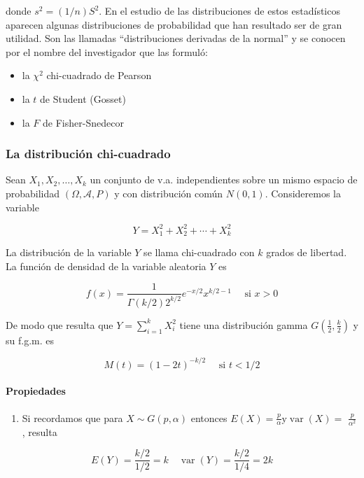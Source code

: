 \documentclass[
]{article}
\providecommand{\tightlist}{%
  \setlength{\itemsep}{0pt}\setlength{\parskip}{0pt}}
\begin{document}
donde \(s^{2}=(1 / n) S^{2}\).
En el estudio de las distribuciones de estos estadísticos aparecen algunas distribuciones de probabilidad que han resultado ser de gran utilidad. Son las llamadas ``distribuciones derivadas de la normal'' y se conocen por el nombre del investigador que las formuló:

\begin{itemize}
\tightlist
\item
  la \(\chi^{2}\) chi-cuadrado de Pearson
\item
  la \(t\) de Student (Gosset)
\item
  la \(F\) de Fisher-Snedecor
\end{itemize}

\subsubsection{La distribución chi-cuadrado}\label{la-distribuciuxf3n-chi-cuadrado}

Sean \(X_{1}, X_{2}, \ldots, X_{k}\) un conjunto de v.a. independientes sobre un mismo espacio de probabilidad \((\Omega, \mathcal{A}, P)\) y con distribución común \(N(0,1)\). Consideremos la variable

\[
Y=X_{1}^{2}+X_{2}^{2}+\cdots+X_{k}^{2}
\]

La distribución de la variable \(Y\) se llama chi-cuadrado con \(k\) grados de libertad.
La función de densidad de la variable aleatoria \(Y\) es

\[
f(x)=\frac{1}{\Gamma(k / 2) 2^{k / 2}} e^{-x / 2} x^{k / 2-1} \quad \text { si } x>0
\]

De modo que resulta que \(Y=\sum_{i=1}^{k} X_{i}^{2}\) tiene una distribución gamma \(G\left(\frac{1}{2}, \frac{k}{2}\right)\) y su f.g.m. es

\[
M(t)=(1-2 t)^{-k / 2} \quad \text { si } t<1 / 2
\]

\paragraph{Propiedades}\label{propiedades}

\begin{enumerate}
\def\labelenumi{\arabic{enumi}.}
\tightlist
\item
  Si recordamos que para \(X \sim G(p, \alpha)\) entonces \(E(X)=\frac{p}{\alpha} \mathrm{y} \operatorname{var}(X)=\) \(\frac{p}{\alpha^{2}}\), resulta
\end{enumerate}

\[
E(Y)=\frac{k / 2}{1 / 2}=k \quad \operatorname{var}(Y)=\frac{k / 2}{1 / 4}=2 k
\]
\end{document}
